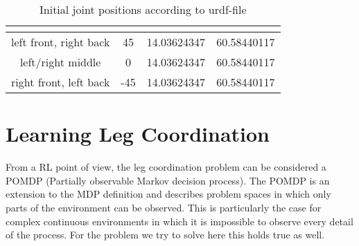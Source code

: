 \begin{table}[h!]
	\centering
	\begin{tabular}{| c | c | c | c |} 
		\hline
		& \textbf{\textalpha} & \textbf{\textbeta} & \textbf{\textgamma} \\ [0.5ex] 
		\hline
		left front, right back & 45 & 14.03624347 & 60.58440117  \\ 
		\hline
		left/right middle & 0 & 14.03624347 & 60.58440117 \\
		\hline
		right front, left back & -45 & 14.03624347 & 60.58440117 \\
		\hline
	\end{tabular}
	\caption{Initial joint positions according to urdf-file}
	\label{table:Initial joint positions}
\end{table}


\section{Learning Leg Coordination} \label{sec: RL setup}
From a RL point of view, the leg coordination problem can be considered a POMDP (Partially observable Markov decision process).
The POMDP is an extension to the MDP definition and describes problem spaces in which only parts of the environment can be observed.
This is particularly the case for complex continuous environments in which it is impossible to observe every detail of the process.
For the problem we try to solve here this holds true as well.


